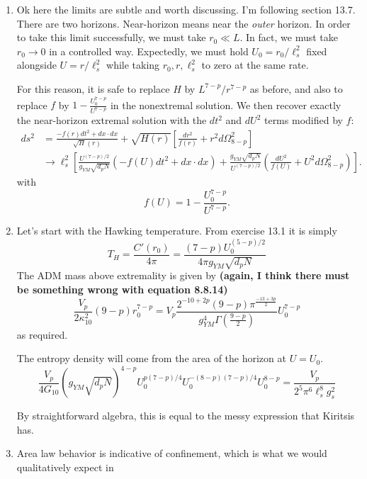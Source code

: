 \documentclass[11pt, class=article, crop=false]{standalone}
\begin{document}
\begin{enumerate}
	Schematically:
	\[
		\ell_s^2 R \sim \frac{\ell_s^2}{r^{(p-3)/2} L^{(7-p)/2}} \sim \frac{1}{\sqrt{g_s \ell_s^{p-3} U^{p-3} N} } \sim \frac{1}{g_{eff}} \sim \sqrt{\frac{U^{3-p}}{g_{YM}^2 N}}
	\]
	as required. 
	
	\item Ok here the limits are subtle and worth discussing. I'm following section 13.7. There are two horizons. Near-horizon means near the \emph{outer} horizon. In order to take this limit successfully, we must take $r_0 \ll L$. In fact, we must take $r_0 \to 0$ in a controlled way. Expectedly, we must hold $U_0 = r_0 / \ell_s^2$ fixed alongside $U = r/\ell_s^2$ while taking $r_0, r, \ell_s^2$ to zero at the same rate. 
	
	For this reason, it is safe to replace $H$ by $L^{7-p}/r^{7-p}$ as before, and also to replace $f$ by $1 - \frac{U_0^{7-p}}{U^{7-p}}$ in the nonextremal solution. We then recover exactly the near-horizon extremal solution with the $dt^2$ and $dU^2$ terms modified by $f$:
	\[
	\begin{aligned}
		ds^2 &= \frac{-f(r)  dt^2 + dx \cdot dx}{\sqrt H(r)} + \sqrt{H(r)} \left[ \frac{dr^2}{f(r)} + r^{2} d\Omega_{8-p}^2\right]\\
		& \to \ell_s^2 \left[ \frac{U^{(7-p)/2}}{g_{YM} \sqrt{d_p N}} (-f(U) dt^2 + dx \cdot dx ) + \frac{g_{YM} \sqrt{d_p N}}{U^{(7-p)/2}} \left(\frac{dU^2}{f(U)} + U^2 d\Omega_{8-p}^2 \right) \right].
	\end{aligned}
	\]
	with 
	\[
		f(U) = 1 - \frac{U_0^{7-p}}{U^{7-p}}.
	\]
	
	\item Let's start with the Hawking temperature. From exercise 13.1 it is simply 
	\[
		T_H = \frac{C'(r_0)}{4\pi} = \frac{(7-p) U_0^{(5-p)/2}}{4 \pi g_{YM} \sqrt{d_p N}}
	\]
	The ADM mass above extremality is given by \textbf{(again, I think there must be something wrong with equation 8.8.14)}
	\[
		\frac{V_p}{2 \kappa_{10}^2}  (9-p) r_0^{7-p} = V_p \frac{2^{-10 + 2p} (9-p) \pi^{\frac{-13 + 3p}{2}}}{g_{YM}^4 \Gamma(\frac{9-p}{2})} U_0^{7-p}
	\]
	as required.
	
	The entropy density will come from the area of the horizon at $U = U_0$.
	\[
		\frac{V_p}{4 G_{10}} (g_{YM} \sqrt{d_p N})^{4-p} U_0^{p (7-p)/4} U_{0}^{-(8-p)(7-p)/4} U_0^{8-p} = \frac{V_p}{2^5 \pi^6 \ell_s^8 g_s^2}
	\]
	
	
	By straightforward algebra, this is equal to the messy expression that Kiritsis has.
		
	\item Area law behavior is indicative of confinement, which is what we would qualitatively expect in 
	
\end{enumerate}
\end{document}
